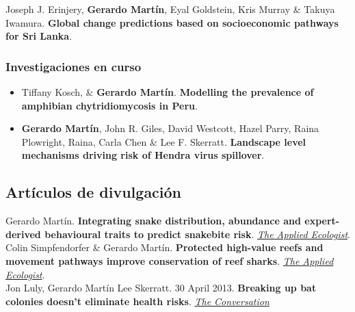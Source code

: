 \documentclass[11pt, letter]{article}
\newcommand{\years}[1]{\marginnote{\scriptsize #1}}
\begin{document}
\years{2022} 	Joseph J. Erinjery, \textbf{Gerardo Mart\'in}, Eyal Goldstein, Kris Murray \& Takuya Iwamura. \textbf{Global change predictions based on socioeconomic pathways for Sri Lanka}.\\

\subsubsection*{Investigaciones en curso}

\begin{itemize}
	
	\item Tiffany Kosch, \& \textbf{Gerardo Mart\'in}. \textbf{Modelling the prevalence of amphibian chytridiomycosis in Peru}.\\
	
	\item \textbf{Gerardo Mart\'in}, John R. Giles, David Westcott, Hazel Parry, Raina Plowright, Raina, Carla Chen \& Lee F. Skerratt. \textbf{Landscape level mechanisms driving risk of Hendra virus spillover}.\\
\end{itemize}


\subsection*{Art\'iculos de divulgaci\'on}

\years{2021} Gerardo Mart\'in. \textbf{Integrating snake distribution, abundance and expert-derived behavioural traits to predict snakebite risk}. \href{https://appliedecologistsblog.com/2021/12/27/integrating-snake-distribution-abundance-and-expert-derived-behavioural-traits-to-predict-snakebite-risk/}{\emph{The Applied Ecologist}}.\\

\years{2020} Colin Simpfendorfer \& Gerardo Mart\'in. \textbf{Protected high-value reefs and movement pathways improve conservation of reef sharks}. \href{https://appliedecologistsblog.com/2020/07/30/protected-high-value-reefs-and-movement-pathways-improve-conservation-of-reef-sharks/}{\emph{The Applied Ecologist}}.\\

\years{2013} Jon Luly, Gerardo Mart\'in Lee Skerratt. 30 April 2013. \textbf{Breaking up bat colonies doesn't eliminate health risks}. \href{http://theconversation.com/breaking-up-bat-colonies-doesnt-eliminate-health-risks-13580}{\emph{The Conversation}}
\end{document}
